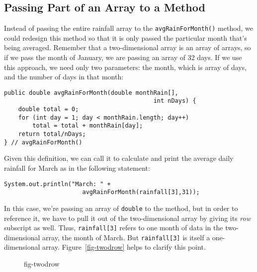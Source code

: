 \subsection{Passing Part of an Array to a Method}
\noindent Instead of passing the entire rainfall array to the
{\tt avgRainForMonth()} method, we could redesign this method so that it
is only passed the particular month that's being averaged.  Remember
that a two-dimensional array is an array of arrays, so if we pass the
month of January, we are passing an array of 32 days.  If we use this
approach, we need only two parameters: the month, which is array of
days, and the number of days in that month:

\begin{jjjlisting}
\begin{lstlisting}
public double avgRainForMonth(double monthRain[], 
                                          int nDays) {
    double total = 0;
    for (int day = 1; day < monthRain.length; day++)
        total = total + monthRain[day];
    return total/nDays;
} // avgRainForMonth()
\end{lstlisting}
\end{jjjlisting}

\noindent Given this definition, we can call it to
calculate and print the average daily rainfall for March as
in the following statement:

\begin{jjjlisting}
\begin{lstlisting}
System.out.println("March: " + 
                      avgRainForMonth(rainfall[3],31));
\end{lstlisting}
\end{jjjlisting}

\noindent In this case, we're passing an array of {\tt double}
to the method, but in order to reference it, we have to pull it out of
the two-dimensional array by giving its {\it row} subscript as well.
Thus, {\tt rainfall[3]} refers to one month of data in the
two-dimensional array, the month of March.  But
{\tt rainfall[3]} is itself a one-dimensional array.
Figure~\ref{fig-twodrow} helps to clarify this point.

\begin{figure}[h!]
{fig-twodrow}
\end{figure}

